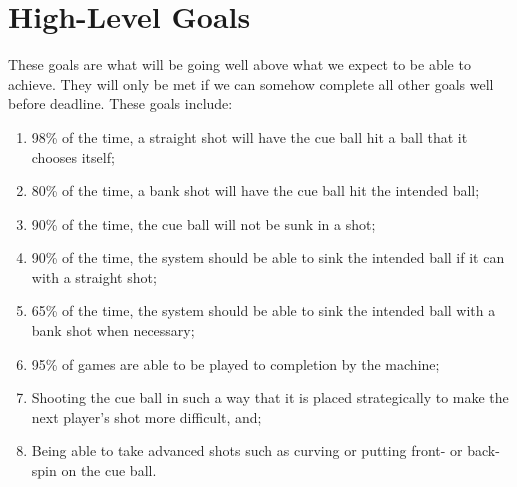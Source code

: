 \documentclass[titlepage]{article}
\begin{document}
\section{High-Level Goals}
These goals are what will be going well above what we expect to be able to achieve. They will only be met if we can somehow complete all other goals well before deadline. These goals include:
\begin{enumerate}
	\item 98\% of the time, a straight shot will have the cue ball hit a ball that it chooses itself;
	\item 80\% of the time, a bank shot will have the cue ball hit the intended ball;
	\item 90\% of the time, the cue ball will not be sunk in a shot;
	\item 90\% of the time, the system should be able to sink the intended ball if it can with a straight shot;
	\item 65\% of the time, the system should be able to sink the intended ball with a bank shot when necessary;
	\item 95\% of games are able to be played to completion by the machine;
	\item Shooting the cue ball in such a way that it is placed strategically to make the next player's shot more difficult, and;
	\item Being able to take advanced shots such as curving or putting front- or back-spin on the cue ball.
\end{enumerate}

\end{document}
